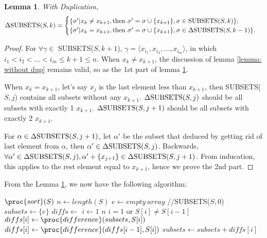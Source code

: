 \documentclass[a4paper, titlepage]{article}
\newtheorem{Lemma}{Lemma}
\begin{document}
\begin{Lemma}\label{lemma: with dup}
With Duplication,
\[
\Delta \textup{SUBSETS(}S, k\textup{)} = \begin{cases}
\{\sigma' | x_k \neq x_{k+1}, \textup{then } \sigma' = \sigma \cup \{x_{k+1}\}, \sigma \in \textup{SUBSETS(}S, k\textup{)}\};  \\
\{\sigma' | x_k = x_{k+1}, \textup{then } \sigma' = \sigma \cup \{x_{k+1}\}, \sigma \in \Delta \textup{SUBSETS(}S, k - 1\textup{)} \}.
\end{cases}
\]
\end{Lemma}
\begin{proof}
For $\forall \gamma \in$ SUBSETS($S, k+1$), $\gamma = \langle x_{i_1}, x_{i_2}, \dots, x_{i_m} \rangle$, in which $ i_1 < i_2 < \dots < i_m \leq k + 1 \leq n$.
When $x_k \neq x_{k+1}$, the discussion of lemma \ref{lemma: without dup} remains valid, so as the 1st part of lemma \ref{lemma: with dup}.

When $x_k = x_{k+1}$, let's say $x_j$ is the last element less than $x_{k+1}$, then SUBSETS($S, j$)  contains all subsets without any $x_{k+1}$. $\Delta\textup{SUBSETS(}S, j\textup{)}$ should be all subsets with exactly 1 $x_{k+1}$. $\Delta\textup{SUBSETS(}S, j+1\textup{)}$ should be all subsets with exactly 2 $x_{k+1}$. 

For $\alpha \in \Delta\textup{SUBSETS(}S, j+1\textup{)}$, let $\alpha'$ be the subset that deduced by getting rid of last element from $\alpha$, then $\alpha' \in \Delta\textup{SUBSETS(}S, j\textup{)}$. Backwards, $\forall \alpha' \in \Delta\textup{SUBSETS(}S, j\textup{)}, \alpha' + \{x_{j+1}\} \in \Delta\textup{SUBSETS(}S, j+1\textup{)}$. From inducation, this applies to the rest element equal to $x_{k+1}$, hence we prove the 2nd part.
\end{proof}

From the Lemma \ref{lemma: with dup}, we now have the following algorithm:

\begin{codebox}
\li $\proc{sort}(S)$
\li $n \gets length(S)$
\li $e \gets empty\ array$ //SUBSETS($S, 0$)
\li $subsets \gets \{e\}$
\li $diffs \gets {}$
\li \For $i \gets 1$ \To $n$
\li 	\Do 
\li 	\If $i = 1$ or $S[i] \neq S[i-1]$
\li 		\Then $diffs[i] \gets \proc{difference}(subsets, S[i])$
\li 		\Else $diffs[i] \gets \proc{difference}(diffs[i-1], S[i])$
			\End
\li 	$subsets \gets subsets + diffs[i]$
       \End
\li {}
\end{codebox}
\end{document}
